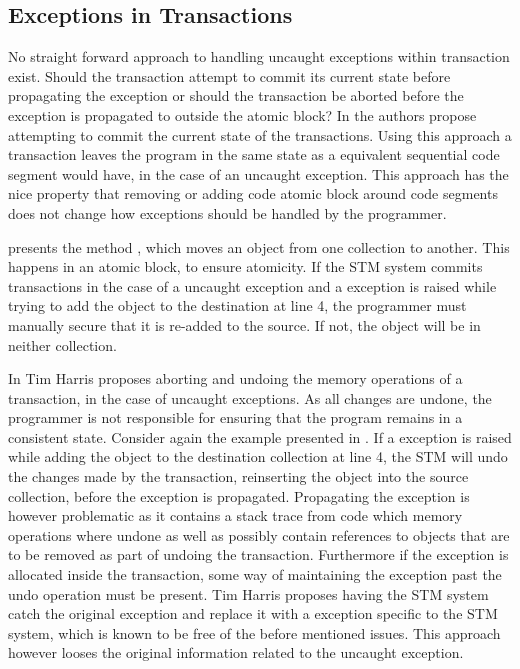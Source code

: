 \subsection{Exceptions in Transactions}
\label{subsec:stm:side_effects}
No straight forward approach to handling uncaught exceptions within transaction exist\cite[p. 80]{harris2010transactional}. Should the transaction attempt to commit its current state before propagating the exception or should the transaction be aborted before the exception is propagated to outside the atomic block?  In \cite{harris2003language} the authors propose attempting to commit the current state of the transactions. Using this approach a transaction leaves the program in the same state as a equivalent sequential code segment would have, in the case of an uncaught exception. This approach has the nice property that removing or adding code atomic block around code segments does not change how exceptions should be handled by the programmer\cite[p. 79]{harris2010transactional}.

 presents the method , which moves an object from one collection to another. This happens in an atomic block, to ensure atomicity. If the \ac{STM} system commits transactions in the case of a uncaught exception and a exception is raised while trying to add the object to the destination at line 4, the programmer must manually secure that it is re-added to the source. If not, the object will be in neither collection.

In \cite{harris2005exceptions} Tim Harris proposes aborting and undoing the memory operations of a transaction, in the case of uncaught exceptions. As all changes are undone, the programmer is not responsible for ensuring that the program remains in a consistent state\cite[p.3]{harris2005exceptions}\cite[p. 80]{harris2010transactional}. Consider again the example presented in . If a exception is raised while adding the object to the destination collection at line 4, the \ac{STM} will undo the changes made by the transaction, reinserting the object into the source collection, before the exception is propagated. Propagating the exception is however problematic as it contains a stack trace from code which memory operations where undone as well as possibly contain references to objects that are to be removed as part of undoing the transaction. Furthermore if the exception is allocated inside the transaction, some way of maintaining the exception past the undo operation must be present. Tim Harris proposes having the \ac{STM} system catch the original exception and replace it with a exception specific to the \ac{STM} system, which is known to be free of the before mentioned issues\cite[p. 3]{harris2005exceptions}. This approach however looses the original information related to the uncaught exception.

